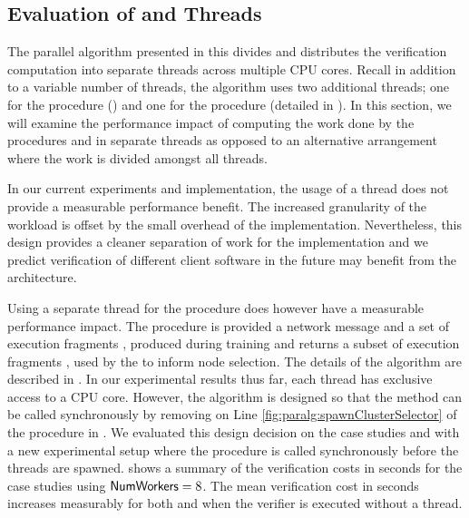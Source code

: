 \subsection{Evaluation of \nodeScheduler and \clusterSelector Threads}

The parallel algorithm presented in this \paper divides and
distributes the verification computation into separate threads across
multiple CPU cores. Recall in addition to a variable number of
\verifyWorker threads, the algorithm uses two additional threads; one
for the \nodeScheduler procedure () and one for
the \clusterSelector procedure (detailed in ). In this section,
we will examine the performance impact of computing the work done by
the procedures \nodeScheduler and \clusterSelector in separate threads
as opposed to an alternative arrangement where the work is divided
amongst all \verifyWorker threads.

In our current experiments and implementation, the usage of a
\nodeScheduler thread does not provide a measurable performance
benefit. The increased granularity of the workload is offset by the
small overhead of the implementation. Nevertheless, this design
provides a cleaner separation of work for the implementation and we
predict verification of different client software in the future may
benefit from the architecture.

Using a separate thread for the \clusterSelector procedure does
however have a measurable performance impact. The procedure
\clusterSelector is provided a network message \msg{\msgNmbr} and a
set of execution fragments \trainingFrags{}, produced during training
and returns a subset of execution fragments \trainingFrags{\msgNmbr},
used by the \nodeScheduler to inform node selection. The
details of the \clusterSelector algorithm are described in
.
In our experimental results thus far, each thread has exclusive access
to a CPU core. However, the algorithm is designed so that the
\clusterSelector method can be called synchronously by removing \Spawn
on Line \ref{fig:paralg:spawnClusterSelector} of the
\parallelVerifyAlg procedure in . We evaluated this
design decision on the case studies \xpilot and \tetrinet with a new
experimental setup where the \clusterSelector procedure is called
synchronously before the \verifyWorker threads are spawned.
 shows a summary of the verification costs
in seconds for the case studies using $\mathsf{NumWorkers} = 8$.
The mean verification cost in seconds increases measurably for both
\xpilot and \tetrinet when the verifier is executed without a
\clusterSelector thread.


